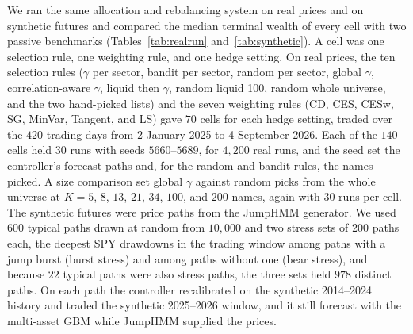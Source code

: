
We ran the same allocation and rebalancing system on real prices and on synthetic futures and compared the median
terminal wealth of every cell with two passive benchmarks (Tables~\ref{tab:realrun} and~\ref{tab:synthetic}). A cell
was one selection rule, one weighting rule, and one hedge setting. On real prices, the ten selection rules ($\gamma$
per sector, bandit per sector, random per sector, global $\gamma$, correlation-aware $\gamma$, liquid then $\gamma$,
random liquid 100, random whole universe, and the two hand-picked lists) and the seven weighting rules (CD, CES,
CESw, SG, MinVar, Tangent, and LS) gave $70$ cells for each hedge setting, traded over the $420$ trading days from
2 January 2025 to 4 September 2026.
Each of the $140$ cells held $30$ runs with seeds $5660$--$5689$, for $4{,}200$ real runs, and the seed set the
controller's forecast paths and, for the random and bandit rules, the names picked.
A size comparison set global $\gamma$ against random picks from the whole universe at $K = 5$, $8$, $13$, $21$, $34$,
$100$, and $200$ names, again with $30$ runs per cell.
The synthetic futures were price paths from the JumpHMM generator. We used $600$ typical paths drawn at random from
$10{,}000$ and two stress sets of $200$ paths each, the deepest SPY drawdowns in the trading window among paths with a
jump burst (burst stress) and among paths without one (bear stress), and because $22$ typical paths were also stress
paths, the three sets held $978$ distinct paths. On each path the controller recalibrated on the synthetic 2014--2024
history and traded the synthetic 2025--2026 window, and it still forecast with the multi-asset GBM while JumpHMM
supplied the prices.

